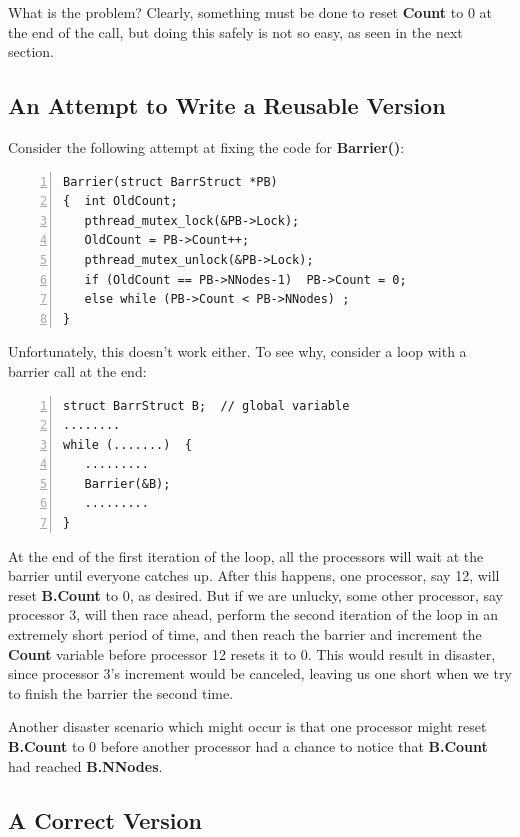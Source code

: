 What is the problem? Clearly, something must be done to reset 
{\bf Count} to 0 at the end of the call, but doing this safely is not
so easy, as seen in the next section.

\subsection{An Attempt to Write a Reusable Version}

Consider the following attempt at fixing the code for {\bf Barrier()}:

\begin{samepage}
\begin{Verbatim}[fontsize=\relsize{-2},numbers=left]
Barrier(struct BarrStruct *PB)
{  int OldCount;
   pthread_mutex_lock(&PB->Lock);
   OldCount = PB->Count++;
   pthread_mutex_unlock(&PB->Lock);
   if (OldCount == PB->NNodes-1)  PB->Count = 0;
   else while (PB->Count < PB->NNodes) ;
}
\end{Verbatim}
\end{samepage}

Unfortunately, this doesn't work either. To see why, consider a loop with a
barrier call at the end:

\begin{samepage}
\begin{Verbatim}[fontsize=\relsize{-2},numbers=left]
struct BarrStruct B;  // global variable 
........
while (.......)  {
   .........
   Barrier(&B);
   .........
}
\end{Verbatim}
\end{samepage}

At the end of the first iteration of the loop, all the processors will
wait at the barrier until everyone catches up. After this happens, one
processor, say 12, will reset {\bf B.Count} to 0, as desired. But if we
are unlucky, some other processor, say processor 3, will then race ahead,
perform the second iteration of the loop in an extremely short period of
time, and then reach the barrier and increment the {\bf Count} variable
before processor 12 resets it to 0. This would result in disaster, since
processor 3's increment would be canceled, leaving us one short when we
try to finish the barrier the second time.

Another disaster scenario which might occur is that one processor might
reset {\bf B.Count} to 0 before another processor had a chance to notice
that {\bf B.Count} had reached {\bf B.NNodes}.

\subsection{A Correct Version}


